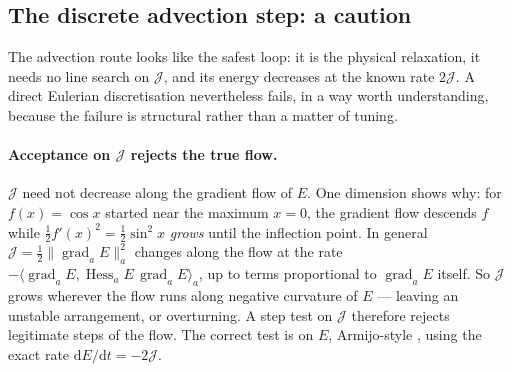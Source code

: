 \documentclass[11pt]{article}
\newcommand{\Jf}{\mathscr{J}}  %
\newcommand{\norm}[1]{\lVert #1 \rVert}
\newcommand{\ip}[2]{\langle #1, #2\rangle}
\begin{document}
\subsection{The discrete advection step: a caution}
\label{sec:advection-caution}

The advection route looks like the safest loop: it is the physical
relaxation, it needs no line search on $\Jf $, and its energy decreases at
the known rate $2\Jf $. A direct Eulerian discretisation nevertheless fails,
in a way worth understanding, because the failure is structural rather
than a matter of tuning.

\paragraph{Acceptance on $\Jf $ rejects the true flow.} $\Jf $ need not
decrease along the gradient flow of $E$. One dimension shows why: for
$f(x) = \cos x$ started near the maximum $x = 0$, the gradient flow
descends $f$ while $\tfrac12 f'(x)^2 = \tfrac12\sin^2x$ \emph{grows} until
the inflection point. In general $\Jf  = \tfrac12\norm{\operatorname{grad}_aE}_a^2$
changes along the flow at the rate $-\ip{\operatorname{grad}_aE}
{\operatorname{Hess}_aE\,\operatorname{grad}_aE}_a$, up to terms
proportional to $\operatorname{grad}_aE$ itself. So $\Jf $ grows wherever the
flow runs along negative curvature of $E$ --- leaving an unstable
arrangement, or overturning. A step test on $\Jf $ therefore rejects
legitimate steps of the flow. The correct test is on $E$, Armijo-style \cite{Armijo1966},
using the exact rate $\mathrm{d}E/\mathrm{d}t = -2\Jf $.
\end{document}
